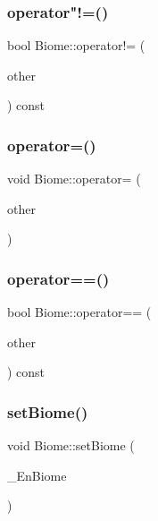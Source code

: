 \mbox{\label{class_biome_a5f619965ed1bf4b1f7423cbb69be3559}} 
\subsubsection{\texorpdfstring{operator"!=()}{operator!=()}}
{\footnotesize\ttfamily bool Biome\+::operator!= (\begin{DoxyParamCaption}\item[{const \mbox{\hyperlink{class_biome}{Biome}} \&}]{other }\end{DoxyParamCaption}) const}

\mbox{\label{class_biome_a5a66500c836cefef0f6cf47af93fe3df}} 
\subsubsection{\texorpdfstring{operator=()}{operator=()}}
{\footnotesize\ttfamily void Biome\+::operator= (\begin{DoxyParamCaption}\item[{const \mbox{\hyperlink{class_biome}{Biome}} \&}]{other }\end{DoxyParamCaption})}

\mbox{\label{class_biome_ab30d25f0400f31071794964de3224b6b}} 
\subsubsection{\texorpdfstring{operator==()}{operator==()}}
{\footnotesize\ttfamily bool Biome\+::operator== (\begin{DoxyParamCaption}\item[{const \mbox{\hyperlink{class_biome}{Biome}} \&}]{other }\end{DoxyParamCaption}) const}

\mbox{\label{class_biome_afb3047918646d9d7717b74091efa378b}} 
\subsubsection{\texorpdfstring{set\+Biome()}{setBiome()}}
{\footnotesize\ttfamily void Biome\+::set\+Biome (\begin{DoxyParamCaption}\item[{\mbox{\hyperlink{_enum_types_8hpp_a5c2255009cd01c90cf68245e6f453d1c}{en\+Biomes}}}]{\+\_\+\+En\+Biome }\end{DoxyParamCaption})}


